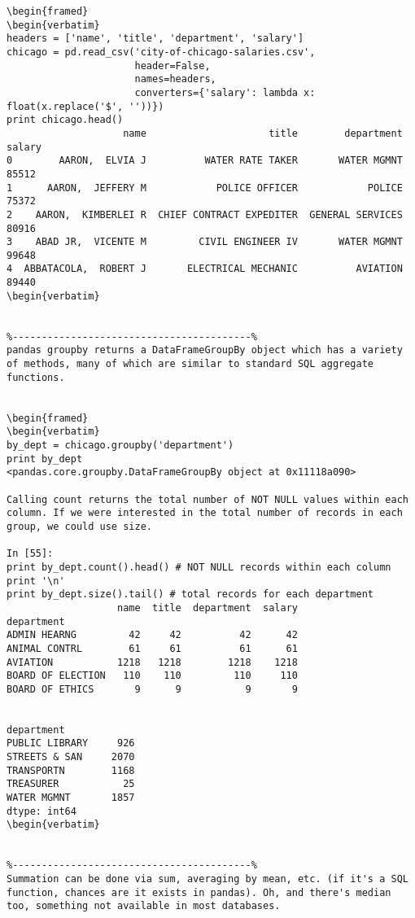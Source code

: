 \begin{framed}
\begin{framed}
\begin{framed}
\begin{framed}
\begin{framed}
\begin{framed}
\begin{framed}
\begin{framed}
\begin{framed}
\begin{framed}
\begin{framed}
\begin{framed}
\begin{framed}
\begin{framed}
\begin{framed}
\begin{framed}
\begin{framed}
\begin{framed}
\begin{verbatim}
\begin{framed}
\begin{verbatim}
headers = ['name', 'title', 'department', 'salary']
chicago = pd.read_csv('city-of-chicago-salaries.csv',
                      header=False,
                      names=headers,
                      converters={'salary': lambda x: float(x.replace('$', ''))})
print chicago.head()
                    name                     title        department  salary
0        AARON,  ELVIA J          WATER RATE TAKER       WATER MGMNT   85512
1      AARON,  JEFFERY M            POLICE OFFICER            POLICE   75372
2    AARON,  KIMBERLEI R  CHIEF CONTRACT EXPEDITER  GENERAL SERVICES   80916
3    ABAD JR,  VICENTE M         CIVIL ENGINEER IV       WATER MGMNT   99648
4  ABBATACOLA,  ROBERT J       ELECTRICAL MECHANIC          AVIATION   89440
\begin{verbatim}


%-----------------------------------------%
pandas groupby returns a DataFrameGroupBy object which has a variety of methods, many of which are similar to standard SQL aggregate functions.


\begin{framed}
\begin{verbatim}
by_dept = chicago.groupby('department')
print by_dept
<pandas.core.groupby.DataFrameGroupBy object at 0x11118a090>

Calling count returns the total number of NOT NULL values within each column. If we were interested in the total number of records in each group, we could use size.

In [55]:
print by_dept.count().head() # NOT NULL records within each column
print '\n'
print by_dept.size().tail() # total records for each department
                   name  title  department  salary
department                                        
ADMIN HEARNG         42     42          42      42
ANIMAL CONTRL        61     61          61      61
AVIATION           1218   1218        1218    1218
BOARD OF ELECTION   110    110         110     110
BOARD OF ETHICS       9      9           9       9


department
PUBLIC LIBRARY     926
STREETS & SAN     2070
TRANSPORTN        1168
TREASURER           25
WATER MGMNT       1857
dtype: int64
\begin{verbatim}


%-----------------------------------------%
Summation can be done via sum, averaging by mean, etc. (if it's a SQL function, chances are it exists in pandas). Oh, and there's median too, something not available in most databases.



\end{verbatim}
\end{framed}
\end{framed}
\end{framed}
\end{framed}
\end{framed}
\end{framed}
\end{framed}
\end{framed}
\end{framed}
\end{framed}
\end{framed}
\end{framed}
\end{framed}
\end{framed}
\end{framed}
\end{framed}
\end{framed}
\end{framed}
